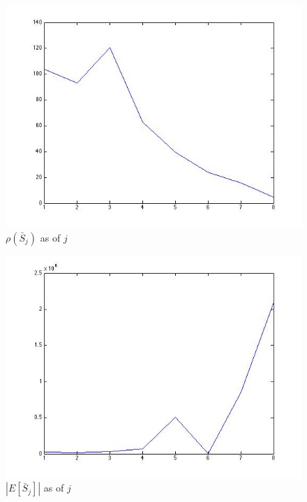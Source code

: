 \documentclass{article}
\begin{document}
\begin{figure}[H]
\centering
\includegraphics[scale=0.5]{q4c-rho.jpg}
\caption{ $\rho(\bar S_j)$ as of $j$}
\label{}
\end{figure}

\begin{figure}[H]
\centering
\includegraphics[scale=0.5]{q4c-esi.jpg}
\caption{ $|E[\bar S_j]|$ as of $j$}
\label{}
\end{figure}
\end{document}
